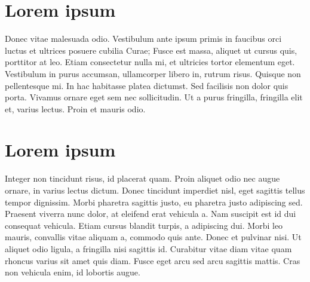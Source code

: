 \section{Lorem ipsum}
Donec vitae malesuada odio. Vestibulum ante ipsum primis in faucibus orci luctus et ultrices posuere cubilia Curae; Fusce est massa, aliquet ut cursus quis, porttitor at leo. Etiam consectetur nulla mi, et ultricies tortor elementum eget. Vestibulum in purus accumsan, ullamcorper libero in, rutrum risus. Quisque non pellentesque mi. In hac habitasse platea dictumst. Sed facilisis non dolor quis porta. Vivamus ornare eget sem nec sollicitudin. Ut a purus fringilla, fringilla elit et, varius lectus. Proin et mauris odio.

\section{Lorem ipsum}
Integer non tincidunt risus, id placerat quam. Proin aliquet odio nec augue ornare, in varius lectus dictum. Donec tincidunt imperdiet nisl, eget sagittis tellus tempor dignissim. Morbi pharetra sagittis justo, eu pharetra justo adipiscing sed. Praesent viverra nunc dolor, at eleifend erat vehicula a. Nam suscipit est id dui consequat vehicula. Etiam cursus blandit turpis, a adipiscing dui. Morbi leo mauris, convallis vitae aliquam a, commodo quis ante. Donec et pulvinar nisi. Ut aliquet odio ligula, a fringilla nisi sagittis id. Curabitur vitae diam vitae quam rhoncus varius sit amet quis diam. Fusce eget arcu sed arcu sagittis mattis. Cras non vehicula enim, id lobortis augue.
